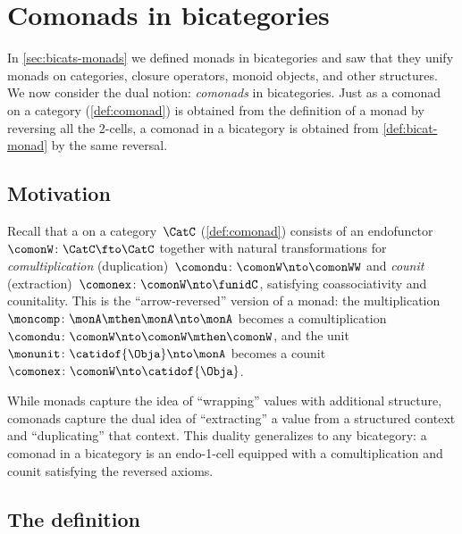 
\section{Comonads in bicategories}
\label{sec:bicats-comonads}

In \cref{sec:bicats-monads} we defined monads in bicategories and saw that they unify monads on categories, closure operators, monoid objects, and other structures.
We now consider the dual notion: \emph{comonads} in bicategories.
Just as a comonad on a category (\cref{def:comonad}) is obtained from the definition of a monad by reversing all the 2-cells, a comonad in a bicategory is obtained from \cref{def:bicat-monad} by the same reversal.

\subsection{Motivation}

Recall that a  on a category~$\CatC$ (\cref{def:comonad}) consists of an endofunctor~$\comonW \colon \CatC \fto \CatC$ together with natural transformations for \emph{comultiplication} (duplication)~$\comondu \colon \comonW \nto \comonWW$ and \emph{counit} (extraction)~$\comonex \colon \comonW \nto \funidC$, satisfying coassociativity and counitality.
This is the ``arrow-reversed'' version of a monad: the multiplication~$\moncomp \colon \monA \mthen \monA \nto \monA$ becomes a comultiplication~$\comondu \colon \comonW \nto \comonW \mthen \comonW$, and the unit~$\monunit \colon \catidof{\Obja} \nto \monA$ becomes a counit~$\comonex \colon \comonW \nto \catidof{\Obja}$.

While monads capture the idea of ``wrapping'' values with additional structure, comonads capture the dual idea of ``extracting'' a value from a structured context and ``duplicating'' that context.
This duality generalizes to any bicategory: a comonad in a bicategory is an endo-1-cell equipped with a comultiplication and counit satisfying the reversed axioms.

\subsection{The definition}

